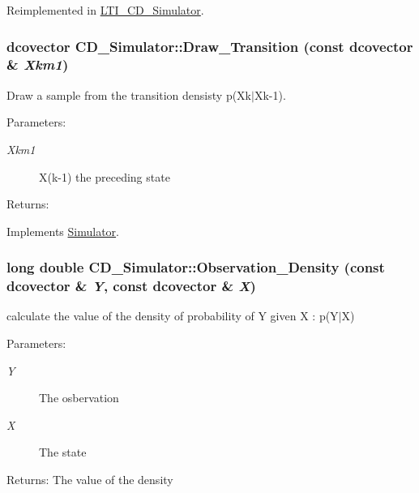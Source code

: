 Reimplemented in \hyperlink{class_l_t_i___c_d___simulator_1497e233ff1a0d71c2b660fe270c9ff8}{LTI\_\-CD\_\-Simulator}.\hypertarget{class_c_d___simulator_58019a5001ec77da3233b072f6328b30}{
\subsubsection[{Draw\_\-Transition}]{\setlength{\rightskip}{0pt plus 5cm}dcovector CD\_\-Simulator::Draw\_\-Transition (const dcovector \& {\em Xkm1})}}
\label{class_c_d___simulator_58019a5001ec77da3233b072f6328b30}


Draw a sample from the transition densisty p(Xk$|$Xk-1). 

\begin{Desc}
\item[Parameters:]
\begin{description}
\item[{\em Xkm1}]X(k-1) the preceding state\end{description}
\end{Desc}
\begin{Desc}
\item[Returns:]\end{Desc}


Implements \hyperlink{class_simulator_45790421a1c2f597739d3e972ad28292}{Simulator}.\hypertarget{class_c_d___simulator_905fb2ac4a72f5d7e44957fa8103cab8}{
\subsubsection[{Observation\_\-Density}]{\setlength{\rightskip}{0pt plus 5cm}long double CD\_\-Simulator::Observation\_\-Density (const dcovector \& {\em Y}, \/  const dcovector \& {\em X})}}
\label{class_c_d___simulator_905fb2ac4a72f5d7e44957fa8103cab8}


calculate the value of the density of probability of Y given X : p(Y$|$X) 

\begin{Desc}
\item[Parameters:]
\begin{description}
\item[{\em Y}]The osbervation \item[{\em X}]The state\end{description}
\end{Desc}
\begin{Desc}
\item[Returns:]The value of the density \end{Desc}


